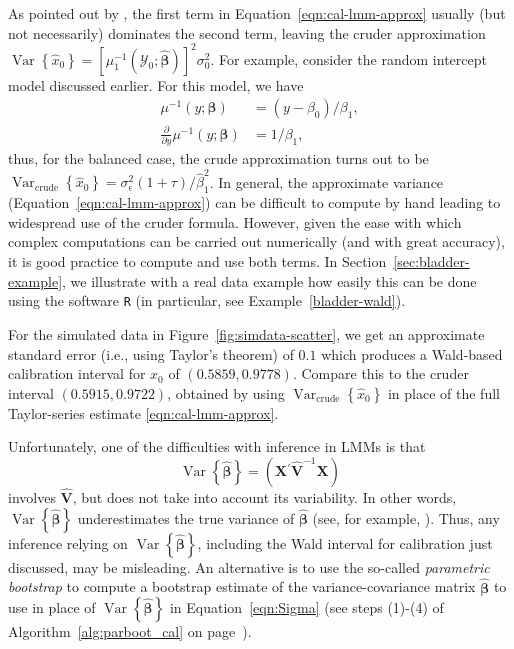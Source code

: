 \documentclass[cmfont,usenames,dvipsnames,leqno]{afit-etd}\usepackage[]{graphicx}\usepackage[]{color}
\newcommand{\code}[1]{\texttt{\small{#1}}}
\newcommand{\trans}{\ensuremath{^\prime}}
\newcommand{\mc}[1]{\ensuremath{\mathcal{#1}}}
\newcommand{\wh}[1]{\ensuremath{\widehat{#1}}}
\newcommand{\var}{\operatorname{Var}}
\newcommand{\X}{\ensuremath{\bm{X}}}
\begin{document}
As pointed out by \citet[p. 283]{davidian_nonlinear_1995}, the first term in Equation~\eqref{eqn:cal-lmm-approx} usually (but not necessarily) dominates the second term, leaving the cruder approximation $\var\left\{\wh{x}_0\right\} = \left[\mu_1^{-1}\left(\mc{Y}_0; \wh{\bm{\beta}}\right)\right]^2\sigma_0^2$. For example, consider the random intercept model discussed earlier. For this model, we have
\begin{align*}
  \mu^{-1}\left(y; \bm{\beta}\right) &= \left(y - \beta_0\right)/\beta_1, \\
  \frac{\partial}{\partial y}\mu^{-1}\left(y; \bm{\beta}\right) &= 1/\beta_1,
\end{align*}
thus, for the balanced case, the crude approximation turns out to be $\var_\mathrm{crude}\left\{\wh{x}_0\right\} = \sigma_\epsilon^2\left(1 + \tau\right)/\wh{\beta}_1^2$. In general, the approximate variance (Equation~\eqref{eqn:cal-lmm-approx}) can be difficult to compute by hand leading to widespread use of the cruder formula. However, given the ease with which complex computations can be carried out numerically (and with great accuracy), it is good practice to compute and use both terms. In Section~\ref{sec:bladder-example}, we illustrate with a real data example how easily this can be done using the software \code{R} (in particular, see Example~\ref{bladder-wald}).

For the simulated data in Figure~\ref{fig:simdata-scatter}, we get an approximate standard error (i.e., using Taylor's theorem) of $0.1$ which produces a Wald-based calibration interval for $x_0$ of $(0.5859, 0.9778)$. Compare this to the cruder interval $(0.5915, 0.9722)$, obtained by using $\var_\mathrm{crude}\left\{\wh{x}_0\right\}$ in place of the full Taylor-series estimate \eqref{eqn:cal-lmm-approx}.

Unfortunately, one of the difficulties with inference in LMMs is that 
\begin{equation*}
  \var\left\{\wh{\bm{\beta}}\right\} = \left(\X\trans\wh{\bm{V}}^{-1}\X\right)  
\end{equation*}  
involves $\wh{\bm{V}}$, but does not take into account its variability. In other words, $\var\left\{\wh{\bm{\beta}}\right\}$ underestimates the true variance of $\wh{\bm{\beta}}$ (see, for example, \citet[pp. 165-167]{mcculloch_generalized_2008}). Thus, any inference relying on $\var\left\{\wh{\bm{\beta}}\right\}$, including the Wald interval for calibration just discussed, may be misleading. An alternative is to use the so-called \textit{parametric bootstrap} to compute a bootstrap estimate of the variance-covariance matrix $\wh{\bm{\beta}}$ to use in place of $\var\left\{\wh{\bm{\beta}}\right\}$ in Equation~\eqref{eqn:Sigma} (see steps (1)-(4) of Algorithm~\ref{alg:parboot_cal} on page~\pageref{alg:parboot_cal}). 
\end{document}
